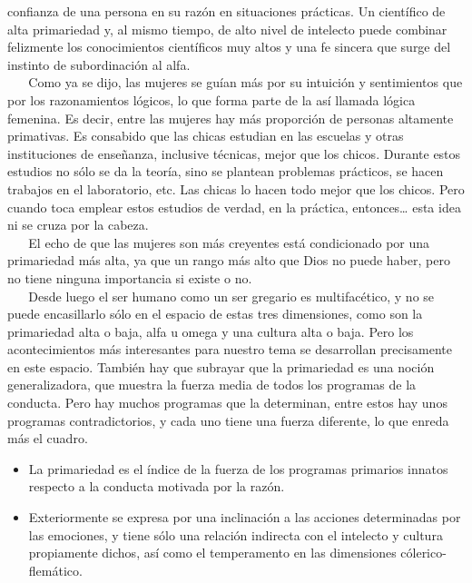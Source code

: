 confianza de una persona en su razón en situaciones prácticas. Un
científico de alta primariedad y, al mismo tiempo, de alto nivel de
intelecto puede combinar felizmente los conocimientos científicos muy
altos y una fe sincera que surge del instinto de subordinación al alfa.\\
\hspace*{0.333em} ~ ~ Como ya se dijo, las mujeres se guían más por su
intuición y sentimientos que por los razonamientos lógicos, lo que forma
parte de la así llamada lógica femenina. Es decir, entre las mujeres hay
más proporción de personas altamente primativas. Es consabido que las
chicas estudian en las escuelas y otras instituciones de enseñanza,
inclusive técnicas, mejor que los chicos. Durante estos estudios no sólo
se da la teoría, sino se plantean problemas prácticos, se hacen trabajos
en el laboratorio, etc. Las chicas lo hacen todo mejor que los chicos.
Pero cuando toca emplear estos estudios de verdad, en la práctica,
entonces\ldots{} esta idea ni se cruza por la cabeza.\\
\hspace*{0.333em} ~ ~ El echo de que las mujeres son más creyentes está
condicionado por una primariedad más alta, ya que un rango más alto que
Dios no puede haber, pero no tiene ninguna importancia si existe o no.\\
\hspace*{0.333em} ~ ~ Desde luego el ser humano como un ser gregario es
multifacético, y no se puede encasillarlo sólo en el espacio de estas
tres dimensiones, como son la primariedad alta o baja, alfa u omega y
una cultura alta o baja. Pero los acontecimientos más interesantes para
nuestro tema se desarrollan precisamente en este espacio. También hay
que subrayar que la primariedad es una noción generalizadora, que
muestra la fuerza media de todos los programas de la conducta. Pero hay
muchos programas que la determinan, entre estos hay unos programas
contradictorios, y cada uno tiene una fuerza diferente, lo que enreda
más el cuadro.

\begin{itemize}

\item
  La primariedad es el índice de la fuerza de los programas primarios
  innatos respecto a la conducta motivada por la razón.
\item
  Exteriormente se expresa por una inclinación a las acciones
  determinadas por las emociones, y tiene sólo una relación indirecta
  con el intelecto y cultura propiamente dichos, así como el
  temperamento en las dimensiones cólerico-flemático.
\end{itemize}

